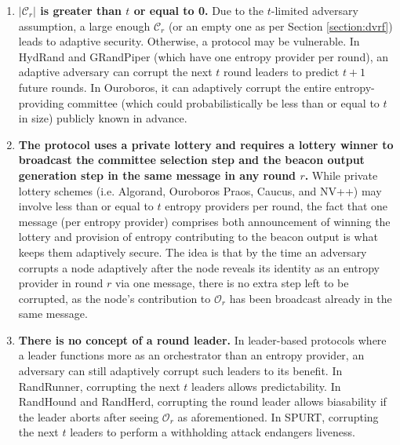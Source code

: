 \documentclass[letterpaper,twocolumn,10pt]{article}
\theoremstyle{definition}
\theoremstyle{remark}
\begin{document}
\begin{enumerate}
\item \textbf{$|\mathcal{C}_r|$ is greater than $t$ or equal to 0.} Due to the $t$-limited adversary assumption, a large enough $\mathcal{C}_r$ (or an empty one as per Section \ref{section:dvrf}) leads to adaptive security. Otherwise, a protocol may be vulnerable. In HydRand and GRandPiper (which have one entropy provider per round), an adaptive adversary can corrupt the next $t$ round leaders to predict $t + 1$ future rounds. In Ouroboros, it can adaptively corrupt the entire entropy-providing committee (which could probabilistically be less than or equal to $t$ in size) publicly known in advance.
\item \textbf{The protocol uses a private lottery and requires a lottery winner to broadcast the committee selection step and the beacon output generation step in the same message in any round $r$.} While private lottery schemes (i.e. Algorand, Ouroboros Praos, Caucus, and NV++) may involve less than or equal to $t$ entropy providers per round, the fact that one message (per entropy provider) comprises both announcement of winning the lottery and provision of entropy contributing to the beacon output is what keeps them adaptively secure. The idea is that by the time an adversary corrupts a node adaptively after the node reveals its identity as an entropy provider in round $r$ via one message, there is no extra step left to be corrupted, as the node's contribution to $\mathcal{O}_r$ has been broadcast already in the same message.
\item \textbf{There is no concept of a round leader.} In leader-based protocols where a leader functions more as an orchestrator than an entropy provider, an adversary can still adaptively corrupt such leaders to its benefit. In RandRunner, corrupting the next $t$ leaders allows predictability. In RandHound and RandHerd, corrupting the round leader allows biasability if the leader aborts after seeing $\mathcal{O}_r$ as aforementioned. In SPURT, corrupting the next $t$ leaders to perform a withholding attack endangers liveness.
\end{enumerate}
\end{document}
